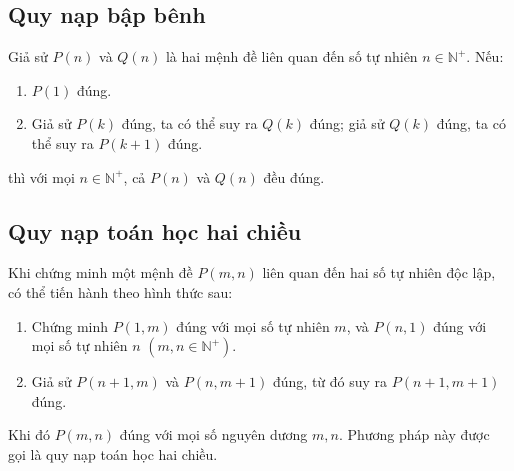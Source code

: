 \documentclass[11pt]{article}
\begin{document}
\subsection{Quy nạp bập bênh}

Giả sử $P(n)$ và $Q(n)$ là hai mệnh đề liên quan đến số tự nhiên
$n\in\mathbb{N}^{+}$. Nếu:
\begin{enumerate}
  \item $P(1)$ đúng.
  \item Giả sử $P(k)$ đúng, ta có thể suy ra $Q(k)$ đúng; giả sử $Q(k)$ đúng,
  ta có thể suy ra $P(k+1)$ đúng.
\end{enumerate}
thì với mọi $n\in\mathbb{N}^{+}$, cả $P(n)$ và $Q(n)$ đều đúng.

\subsection{Quy nạp toán học hai chiều}

Khi chứng minh một mệnh đề $P(m,n)$ liên quan đến hai số tự nhiên độc lập, có
thể tiến hành theo hình thức sau:
\begin{enumerate}
  \item Chứng minh $P(1,m)$ đúng với mọi số tự nhiên $m$, và $P(n,1)$ đúng
  với mọi số tự nhiên $n$ $(m,n\in\mathbb{N}^{+})$.

  \item Giả sử $P(n+1,m)$ và $P(n,m+1)$ đúng, từ đó suy ra $P(n+1,m+1)$ đúng.
\end{enumerate}
Khi đó $P(m,n)$ đúng với mọi số nguyên dương $m,n$. Phương pháp này được gọi
là quy nạp toán học hai chiều.
\end{document}
